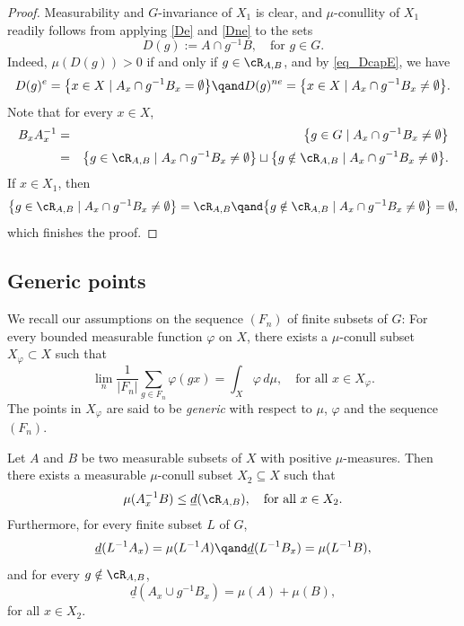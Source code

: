 \begin{proof}
Measurability and $G$-invariance of $X_1$ is clear, and $\mu$-conullity of $X_1$ readily follows from applying \eqref{De} and \eqref{Dne} to the sets
\[
D(g) := A \cap g^{-1}B, \quad \textrm{for $g \in G$}.
\]
Indeed, $\mu(D(g)) > 0$ if and only if $g \in \cR_{A,B}$, and by \eqref{eq_DcapE}, we have
\[
D(g)^{e} = \bigl\{ x \in X \mid  A_x \cap g^{-1} B_x = \emptyset \bigr\}
\qand
D(g)^{ne} = \bigl\{ x \in X \mid  A_x \cap g^{-1}B_x \neq \emptyset \bigr\}.
\]
Note that for every $x \in X$,
\begin{eqnarray*}
B_x A^{-1}_x
&=&
\bigl\{ g \in G \mid  A_x \cap g^{-1} B_x \neq \emptyset \bigr\} \\[2pt]
&=&
\bigl\{ g \in \cR_{A,B} \mid  A_x \cap g^{-1} B_x \neq \emptyset \bigr\} \sqcup \bigl\{ g \notin \cR_{A,B} \mid  A_x \cap g^{-1} B_x \neq \emptyset \bigr\}.
\end{eqnarray*}
If $x \in X_1$, then
\[
\bigl\{ g \in \cR_{A,B} \mid  A_x \cap g^{-1} B_x \neq \emptyset \bigr\} = \cR_{A,B}
\qand
\bigl\{ g \notin \cR_{A,B} \mid  A_x \cap g^{-1} B_x \neq \emptyset \bigr\} = \emptyset,
\]
which finishes the proof.
\end{proof}

\subsection{Generic points}

We recall our assumptions on the sequence $(F_n)$ of finite subsets of $G$: For every bounded measurable function $\varphi$ on $X$,
there exists a $\mu$-conull subset $X_\varphi \subset X$ such that
\[
\lim_n \frac{1}{|F_n|} \sum_{g \in F_n} \varphi(gx) = \int_X \varphi \, d\mu, \quad \textrm{for all $x \in X_\varphi$}.
\]
The points in $X_\varphi$ are said to be \emph{generic} with respect to $\mu$, $\varphi$ and the sequence $(F_n)$.
\begin{lemma}
\label{lemma_generic}
Let $A$ and $B$ be two measurable subsets of $X$ with positive $\mu$-measures. Then there exists a measurable $\mu$-conull subset $X_2 \subseteq X$
such that
\[
\mu(A_x^{-1}B) \leq \underline{d}(\cR_{A,B}), \quad \textrm{for all $x \in X_2$}.
\]
Furthermore, for every finite subset $L$ of $G$,
\[
\underline{d}(L^{-1}A_x) = \mu(L^{-1}A) \qand \underline{d}(L^{-1}B_x) = \mu(L^{-1}B),
\]
and for every $g \notin \cR_{A,B}$,
\[
\underline{d}(A_x \cup g^{-1}B_x) = \mu(A) + \mu(B),
\]
for all $x \in X_2$.
\end{lemma}

